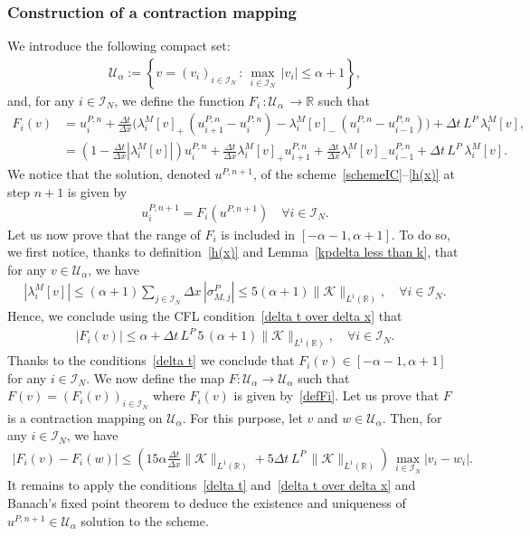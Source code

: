 \documentclass[11pt]{amsart}
\newcommand{\K}{\mathcal{K}}
\newcommand{\R}{\mathbb{R}}
\newcommand{\I}{\mathcal{I}_N}
\begin{document}
\subsubsection{Construction of a contraction mapping}

We introduce the following compact set:
\begin{align*}
    \mathcal{U}_\alpha := \left\{ v=(v_i)_{i \in \I} \,:\,  \max_{i\in\I} \,|v_i|\leq \alpha+1 \right\},
\end{align*}
and, for any $i \in \I$, we define the function $F_i \, : \mathcal{U}_\alpha \, \to \R$ such that
\begin{equation}\begin{array}{ll}\label{defFi}
    F_{i}(v) &= u_i^{P, n} + \frac{\Delta t}{\Delta x}\Big(\lambda^M_i[v]_+ \, (u_{i+1}^{P, n} - \displaystyle u_i^{P, n}) -\lambda^M_i[v]_- \, (u_{i} ^{P, n} - u_{i-1}^{P, n})\Big) +  \Delta t \, L^P \,\lambda^M_i[v], \\
    & \displaystyle = \left(1-\frac{\Delta t}{\Delta x}\left|\lambda^M_i[v]\right|\right) u_i^{P, n} + \frac{\Delta t}{\Delta x}\lambda^M_i[v]_+u_{i+1}^{P, n}+  \frac{\Delta t}{\Delta x}\lambda^M_i[v]_- u_{i-1}^{P, n}+ \Delta t \, L^P \,\lambda^M_i[v]. 
\end{array}\end{equation} 
We notice that the solution, denoted $u^{P,n+1}$, of the scheme~\eqref{schemeIC}--\eqref{h(x)} 
at step $n+1$  is given by
\begin{align*}
    u^{P,n+1}_i = F_i(u^{P,n+1}) \quad \forall i \in \I.
\end{align*}
Let us now prove that the range of $F_i$ is included in $[-\alpha-1,\alpha+1]$. To do so, we first notice, thanks to definition~\eqref{h(x)} and Lemma~\ref{kpdelta less than k}, that for any $v \in \mathcal{U}_\alpha$, we have
\begin{align}
    \left|\lambda_i^M[v]\right| \leq (\alpha+1) \sum_{j \in \I} \Delta x \, \left|\sigma_{M,j}^P\right| \leq 5(\alpha+1) \|\K\|_{L^1(\R)}, \quad \forall i \in \I.
\end{align}
Hence, we conclude using the CFL condition~\eqref{delta t over delta x} that 
\begin{align*}
|F_i(v)| \leq \alpha + \Delta t \, L^P \, 5 \, (\alpha+1) \|\K\|_{L^1(\R)}, \quad \forall i \in \I.
\end{align*}
Thanks to the conditions~\eqref{delta t} we conclude that $F_i(v) \in [-\alpha-1,\alpha+1]$ for any $i \in \I$. We now define the map $F : \mathcal{U}_\alpha \to \mathcal{U}_\alpha$ such that $F(v)=(F_i(v))_{i\in\I}$ where $F_i(v)$ is given by~\eqref{defFi}. Let us prove that $F$ is a contraction mapping on $\mathcal{U}_\alpha$. For this purpose, let $v$ and $w \in \mathcal{U}_\alpha$. Then, for any $i \in \I$, we have
\begin{align*}
    \left|F_i(v) - F_i(w)\right| \leq \left(15\alpha\frac{\Delta t}{\Delta x} \|\K\|_{L^1(\R)}
     + 5\Delta t \, L^P \,  \|\K\|_{L^1(\R)} \right) \, \max_{i \in \I} |v_i-w_i|.
\end{align*}
It remains to apply the conditions~\eqref{delta t} and~\eqref{delta t over delta x} and Banach's fixed point theorem to deduce the existence and uniqueness of $u^{P,n+1}\in \mathcal{U}_\alpha$ solution to the scheme.
\end{document}
